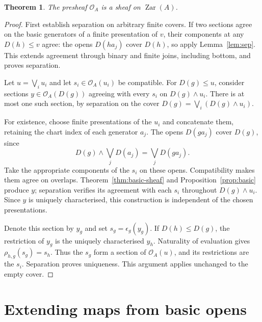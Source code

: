 \documentclass[11pt]{amsart}
\newtheorem{theorem}{Theorem}[section]
\theoremstyle{definition}
\theoremstyle{remark}
\newcommand{\Zar}{\operatorname{Zar}}
\newcommand{\OO}{\mathcal O}
\begin{document}
\begin{theorem}\label{thm:sheaf}
The presheaf $\OO_A$ is a sheaf on $\Zar(A)$.
\end{theorem}
\begin{proof}
First establish separation on arbitrary finite covers. If two sections
agree on the basic generators of a finite presentation of $v$, their
components at any $D(h)\leq v$ agree: the opens $D(ha_j)$ cover $D(h)$,
so apply Lemma~\ref{lem:sep}. This extends agreement through binary and
finite joins, including bottom, and proves separation.

Let $u=\bigvee_i u_i$ and let $s_i\in\OO_A(u_i)$ be compatible. For
$D(g)\leq u$, consider sections $y\in\OO_A(D(g))$ agreeing with every
$s_i$ on $D(g)\wedge u_i$. There is at most one such section, by
separation on the cover $D(g)=\bigvee_i(D(g)\wedge u_i)$.

For existence, choose finite presentations of the $u_i$ and concatenate
them, retaining the chart index of each generator $a_j$. The opens
$D(ga_j)$ cover $D(g)$, since
\[
 D(g)\wedge\bigvee_jD(a_j)=\bigvee_jD(ga_j).
\]
Take the appropriate components of the $s_i$ on these opens.
Compatibility makes them agree on overlaps.
Theorem~\ref{thm:basic-sheaf} and Proposition~\ref{prop:basic} produce
$y$; separation verifies its agreement with each $s_i$ throughout
$D(g)\wedge u_i$. Since $y$ is uniquely characterised, this construction
is independent of the chosen presentations.

Denote this section by $y_g$ and set $s_g=\epsilon_g(y_g)$. If
$D(h)\leq D(g)$, the restriction of $y_g$ is the uniquely characterised
$y_h$. Naturality of evaluation gives $\rho_{h,g}(s_g)=s_h$.
Thus the $s_g$ form a section of $\OO_A(u)$, and its restrictions are
the $s_i$. Separation proves uniqueness. This argument applies unchanged
to the empty cover.
\end{proof}

\section{Extending maps from basic opens}
\end{document}
